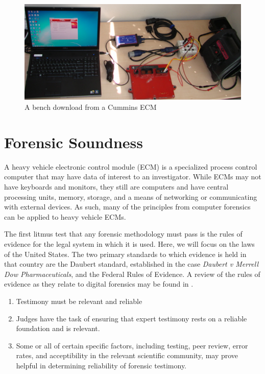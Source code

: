 \begin{figure}[h]

  \includegraphics[scale=0.5]{cumminsbench}
  \caption{A bench download from a Cummins ECM}
  \label{fig:cumminsbench}
\end{figure}

\section{Forensic Soundness}

A heavy vehicle electronic control module (ECM) is a specialized process control computer that may have data of interest to an investigator. 
While ECMs may not have keyboards and monitors, they still are computers and have central processing units, memory, storage, and a means of 
networking or communicating with external devices. As such, many of the principles from computer forensics can be applied to heavy vehicle ECMs.

The first litmus test that any forensic methodology must pass is the rules of evidence for the legal system in which it is used. Here, we will
focus on the laws of the United States. The two primary standards to which evidence is held in that country are the Daubert standard, established
in the case \emph{Daubert v Merrell Dow Pharmaceuticals}, and the Federal Rules of Evidence. A review of the rules of evidence as they relate to 
digital forensics may be found in \cite{meyers2005}.

\begin{enumerate}
  \item Testimony must be relevant and reliable
  \item Judges have the task of ensuring that expert testimony rests on a reliable
        foundation and is relevant.
  \item Some or all of certain specific factors, including testing, peer review, error
        rates, and acceptibility in the relevant scientific community, may prove helpful
        in determining reliability of forensic testimony.
\end{enumerate}

